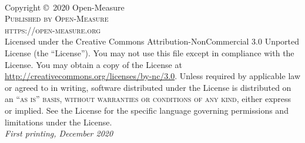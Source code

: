 \documentclass[11pt,fleqn]{book} %
\begin{document}
	

\begingroup
\thispagestyle{empty} %
\vfill
\endgroup


\newpage
~\vfill
\thispagestyle{empty}

\noindent Copyright \copyright\ 2020 Open-Measure\\ %

\noindent \textsc{Published by Open-Measure}\\ %

\noindent \textsc{https://open-measure.org}\\ %

\noindent Licensed under the Creative Commons Attribution-NonCommercial 3.0 Unported License (the ``License''). You may not use this file except in compliance with the License. You may obtain a copy of the License at \url{http://creativecommons.org/licenses/by-nc/3.0}. Unless required by applicable law or agreed to in writing, software distributed under the License is distributed on an \textsc{``as is'' basis, without warranties or conditions of any kind}, either express or implied. See the License for the specific language governing permissions and limitations under the License.\\ %

\noindent \textit{First printing, December 2020} %



\end{document}
